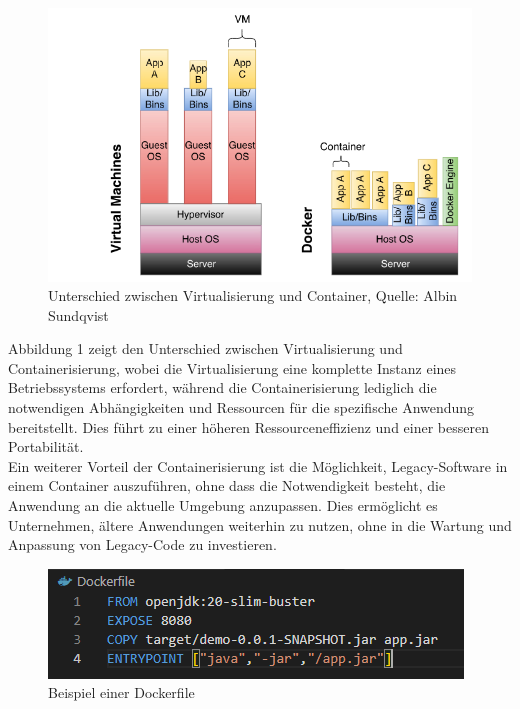 \begin{figure}[h]
	\includegraphics[width=\columnwidth]{gfx/vm vs container.png} %
	\caption{Unterschied zwischen Virtualisierung und Container, Quelle: Albin Sundqvist \cite{sundqvist2020guidelines}}
\end{figure}

Abbildung 1 zeigt den Unterschied zwischen Virtualisierung und Containerisierung, wobei die Virtualisierung eine komplette Instanz eines Betriebssystems erfordert, während die Containerisierung lediglich die notwendigen Abhängigkeiten und Ressourcen für die spezifische Anwendung bereitstellt. Dies führt zu einer höheren Ressourceneffizienz und einer besseren Portabilität. \\

Ein weiterer Vorteil der Containerisierung ist die Möglichkeit, Legacy-Software in einem Container auszuführen, ohne dass die Notwendigkeit besteht, die Anwendung an die aktuelle Umgebung anzupassen. Dies ermöglicht es Unternehmen, ältere Anwendungen weiterhin zu nutzen, ohne in die Wartung und Anpassung von Legacy-Code zu investieren. \\

\begin{figure}[h]
	\includegraphics[width=\columnwidth]{gfx/Dockerfile.png} %
	\caption{Beispiel einer Dockerfile}
\end{figure}

